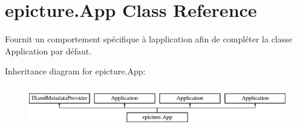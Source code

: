 \hypertarget{classepicture_1_1_app}{}\section{epicture.\+App Class Reference}
\label{classepicture_1_1_app}


Fournit un comportement spécifique à l\textquotesingle{}application afin de compléter la classe Application par défaut.  


Inheritance diagram for epicture.\+App\+:\begin{figure}[H]
\begin{center}
\leavevmode
\includegraphics[height=1.842105cm]{classepicture_1_1_app}
\end{center}
\end{figure}
